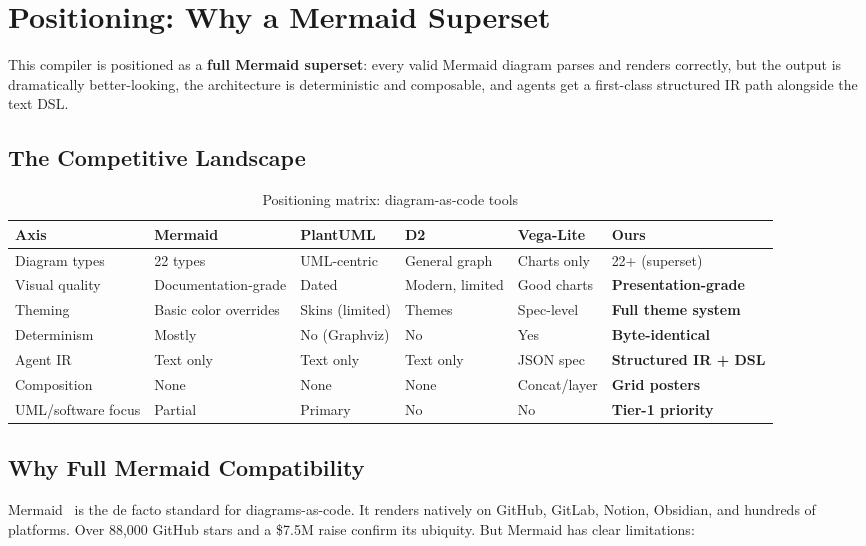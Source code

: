 \section{Positioning: Why a Mermaid Superset}
\label{sec:comparison}

This compiler is positioned as a \textbf{full Mermaid superset}: every valid Mermaid diagram
parses and renders correctly, but the output is dramatically better-looking, the architecture
is deterministic and composable, and agents get a first-class structured IR path alongside the
text DSL.

\subsection{The Competitive Landscape}

\begin{table}[h]
\centering\small
\caption{Positioning matrix: diagram-as-code tools}
\begin{tabularx}{\textwidth}{lXXXXX}
\toprule
\textbf{Axis} & \textbf{Mermaid} & \textbf{PlantUML} & \textbf{D2} & \textbf{Vega-Lite} & \textbf{Ours} \\
\midrule
Diagram types      & 22 types & UML-centric & General graph & Charts only & 22+ (superset) \\
Visual quality     & Documentation-grade & Dated & Modern, limited & Good charts & \textbf{Presentation-grade} \\
Theming            & Basic color overrides & Skins (limited) & Themes & Spec-level & \textbf{Full theme system} \\
Determinism        & Mostly & No (Graphviz) & No & Yes & \textbf{Byte-identical} \\
Agent IR           & Text only & Text only & Text only & JSON spec & \textbf{Structured IR + DSL} \\
Composition        & None & None & None & Concat/layer & \textbf{Grid posters} \\
UML/software focus & Partial & Primary & No & No & \textbf{Tier-1 priority} \\
\bottomrule
\end{tabularx}
\label{tab:positioning-matrix}
\end{table}

\subsection{Why Full Mermaid Compatibility}

Mermaid~\cite{mermaid2023} is the de facto standard for diagrams-as-code.
It renders natively on GitHub, GitLab, Notion, Obsidian, and hundreds of platforms.
Over 88{,}000 GitHub stars and a \$7.5M raise confirm its ubiquity.
But Mermaid has clear limitations:

